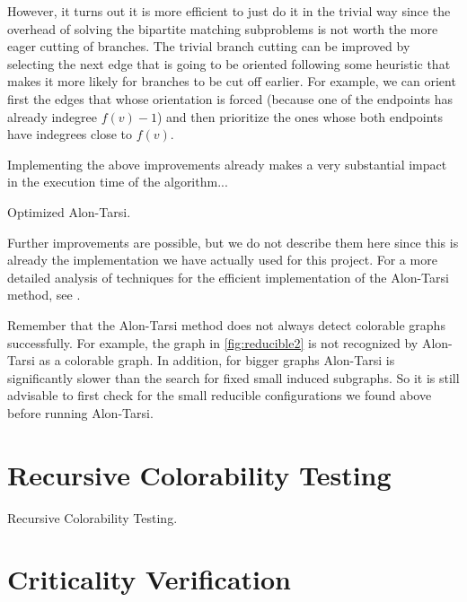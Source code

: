 However, it turns out it is more efficient to just do it in the trivial way since the overhead of solving
the bipartite matching subproblems is not worth the more eager cutting of branches. The trivial branch cutting
can be improved by selecting the next edge that is going to be oriented following some heuristic
that makes it more likely for branches to be cut off earlier. For example, we can orient first the edges that whose orientation is forced (because one of the endpoints has already indegree $f(v)-1$) and then prioritize the ones whose both endpoints have indegrees close to $f(v)$.

Implementing the above improvements already makes a very substantial impact in the execution time
of the algorithm...


\begin{algorithm}[H]
\caption{Optimized Alon-Tarsi.}
\SetAlgoLined
{}



\end{algorithm}

Further improvements are possible, but we do not describe them here since this is already the implementation we have actually used for this project. 
For a more detailed analysis of techniques for the efficient implementation of the Alon-Tarsi method, see \cite{dvorakefficientalontarsi}.


Remember that the Alon-Tarsi method does not always detect colorable graphs successfully. 
For example, the graph in \ref{fig:reducible2} is not recognized by Alon-Tarsi as a colorable graph. 
In addition, for bigger graphs Alon-Tarsi is significantly slower than the search for fixed small induced subgraphs. So it is still advisable to first check for the small 
reducible configurations we found above before running Alon-Tarsi. 

\section{Recursive Colorability Testing}


\begin{algorithm}[H]
\caption{Recursive Colorability Testing.}
\SetAlgoLined
{}


\end{algorithm}
\section{Criticality Verification}

